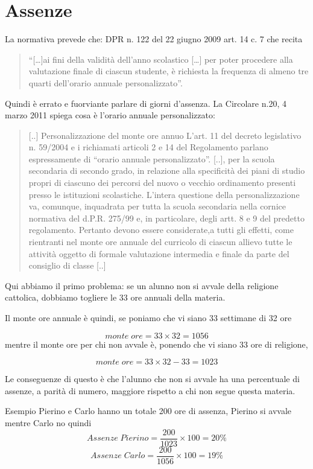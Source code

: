 \documentclass{article}
\begin{document}
\section*{Assenze}
La normativa prevede che: 	DPR n. 122 del 22 giugno 2009 art. 14 c. 7 che recita

\begin{quotation}

 “[…]ai fini della validità dell'anno scolastico
[…] per poter procedere alla valutazione finale di ciascun studente, 
è richiesta la frequenza di almeno tre
quarti dell'orario annuale personalizzato”.
\end{quotation}
Quindi è errato e fuorviante parlare di giorni d'assenza.
La Circolare n.20, 4 marzo 2011 spiega cosa è l'orario annuale personalizzato:

	\begin{quotation}
		[..]
	Personalizzazione del monte ore annuo
	L’art. 11 del decreto legislativo n. 59/2004 e i richiamati articoli 
	2 e 14 del Regolamento
	parlano espressamente di “orario annuale personalizzato”.
[..], per la scuola 
	secondaria 
	di secondo grado, in relazione alla
	specificità dei piani di studio propri di ciascuno dei percorsi 
	del nuovo o vecchio ordinamento
	presenti presso le istituzioni scolastiche.
	L’intera questione della personalizzazione va, comunque, inquadrata
	 per tutta la scuola secondaria nella cornice normativa del d.P.R. 275/99 e,
	 in particolare, degli artt. 8 e 9 del predetto regolamento.
	Pertanto devono essere considerate,a tutti gli effetti, 
	come rientranti nel monte ore annuale del curricolo di ciascun 
	allievo tutte le attività 
	oggetto di formale valutazione intermedia e finale da
	parte del consiglio di classe 
	[..]
	\end{quotation}
Qui abbiamo il primo problema: se un alunno non si avvale della religione cattolica, 
dobbiamo togliere le 33 ore annuali della materia.

Il monte ore annuale è quindi, se poniamo che vi siano 33 settimane di 32 ore

\[monte\; ore=33\times 32=1056\]
mentre il monte ore per chi non avvale è, ponendo che vi siano 33 ore di religione,

\[monte\; ore=33\times 32-33=1023\]

Le conseguenze di questo è che l'alunno che non si avvale ha una percentuale di assenze, a parità di numero, maggiore rispetto a chi non segue questa materia.

 Esempio Pierino e Carlo hanno un totale 200 ore di assenza, Pierino si avvale mentre Carlo no quindi
\[Assenze\; Pierino=\dfrac{200}{1023}\times 100=20\%\]
\[Assenze\; Carlo=\dfrac{200}{1056}\times 100=19\%\]
\end{document}
